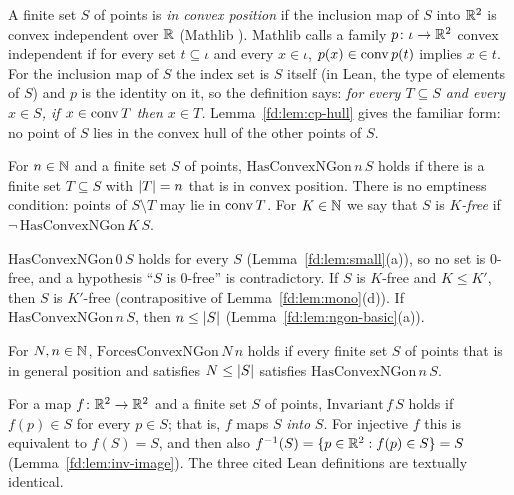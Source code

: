 \begin{definition}\label{fd:def:cp}\sloppy
A finite set $S$ of points is \emph{in convex position} if the inclusion map of $S$ into $\mathbb R^2$ is
convex independent over $\mathbb R$ (Mathlib ). Mathlib calls a family
$p\colon\iota\to\mathbb R^2$ convex independent if for every set $t\subseteq\iota$ and every $x\in\iota$,
$p(x)\in\operatorname{conv} p(t)$ implies $x\in t$. For the inclusion map of $S$ the index set is $S$ itself (in Lean,
the type of elements of $S$) and $p$ is the identity on it, so the definition says: \emph{for every
$T\subseteq S$ and every $x\in S$, if $x\in\operatorname{conv} T$ then $x\in T$.} Lemma~\ref{fd:lem:cp-hull} gives the
familiar form: no point of $S$ lies in the convex hull of the other points of $S$.
\end{definition}

\begin{definition}\label{fd:def:ngon}\sloppy
For $n\in\mathbb N$ and a finite set $S$ of points, $\mathrm{HasConvexNGon}\,n\,S$ holds if there is a finite
set $T\subseteq S$ with $\lvert T\rvert=n$ that is in convex position. There is no emptiness condition: points
of $S\setminus T$ may lie in $\operatorname{conv} T$. For $K\in\mathbb N$ we say that $S$ is \emph{$K$-free} if
$\neg\,\mathrm{HasConvexNGon}\,K\,S$.
\end{definition}

\begin{remark}\label{fd:rem:ngon}
$\mathrm{HasConvexNGon}\,0\,S$ holds for every $S$ (Lemma~\ref{fd:lem:small}(a)), so no set is
$0$-free, and a hypothesis ``$S$ is $0$-free'' is contradictory. If $S$ is $K$-free and $K\le K'$, then
$S$ is $K'$-free (contrapositive of Lemma~\ref{fd:lem:mono}(d)). If $\mathrm{HasConvexNGon}\,n\,S$, then
$n\le\lvert S\rvert$ (Lemma~\ref{fd:lem:ngon-basic}(a)).
\end{remark}

\begin{definition}\label{fd:def:forces}\sloppy
For $N,n\in\mathbb N$, $\mathrm{ForcesConvexNGon}\,N\,n$ holds if every finite set $S$ of points that is in
general position and satisfies $N\le\lvert S\rvert$ satisfies $\mathrm{HasConvexNGon}\,n\,S$.
\end{definition}

\begin{definition}\label{fd:def:inv}\sloppy
For a map $f\colon\mathbb R^2\to\mathbb R^2$ and a finite set $S$ of points, $\mathrm{Invariant}\,f\,S$ holds if
$f(p)\in S$ for every $p\in S$; that is, $f$ maps $S$ \emph{into} $S$. For injective $f$ this is
equivalent to $f(S)=S$, and then also $f^{-1}(S)=\{p\in\mathbb R^2:f(p)\in S\}=S$
(Lemma~\ref{fd:lem:inv-image}). The three cited Lean definitions are textually identical.
\end{definition}

